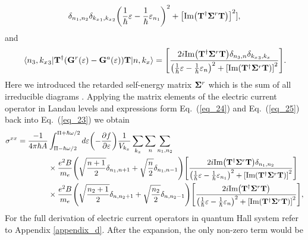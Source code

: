 \begin{widetext}
\begin{equation}
{  \delta_{n_1,n_2}\delta_{{k_x}_1,{k_x}_2}}
  {
  \qty(
  \frac{1}{\hbar}\varepsilon -
  \frac{1}{\hbar}\varepsilon_{n_1}
  )^2
  + \qty[\text{Im}\qty(\vb{T}^{\dagger} \vb{\Sigma}^r \vb{T})]^2
  }],
\end{equation}
and
\begin{equation} \label{eq_25}
  \mel{{n_3,{k_x}_3}}{
  \vb{T}^{\dagger}
  \qty(
  \vb{G}^{r} (\varepsilon) - \vb{G}^{a} (\varepsilon)
  )\vb{T}}
  {n,{k_x}} =
  \qty[
  \frac{2i \text{Im}\qty(\vb{T}^{\dagger} \vb{\Sigma}^r \vb{T})
  \delta_{n_3,n}\delta_{{k_x}_3,{k_x}}}
  {
  \qty(
  \frac{1}{\hbar}\varepsilon -
  \frac{1}{\hbar}\varepsilon_{n}
  )^2
  + \qty[\text{Im}\qty(\vb{T}^{\dagger} \vb{\Sigma}^r \vb{T})]^2
  }].
\end{equation}
Here we introduced the retarded self-energy matrix $\vb{\Sigma}^r$ which is the sum of all irreducible diagrams \cite{wackerl20,wackerlthesis20}. Applying the matrix elements of the electric current operator in Landau levels and
expressions form Eq.~(\ref{eq_24}) and Eq.~(\ref{eq_25}) back into Eq.~(\ref{eq_23}) we obtain
\begin{equation} \label{eq_26}
  \begin{aligned}
    {\sigma}^{xx}  =
    \frac{-1}{4\pi\hbar A} &
    \int_{\Pi-\hbar\omega/2}^{\Pi+ \hbar\omega/2} d\varepsilon
    \qty(
    -\frac{\partial f}{\partial \varepsilon})
    \frac{1}{V_{k_x}} \sum_{k_x} \sum_{n}
    \sum_{n_1,n_2}
    \\
    & \times
    \frac{e^2B}{{m_e}}
    \qty(\sqrt{\frac{n+1}{2}} \delta_{n_1,n+1} + \sqrt{\frac{n}{2}}
    \delta_{n_1,n-1})
    \qty[
    \frac{2i \text{Im}\qty(\vb{T}^{\dagger} \vb{\Sigma}^r \vb{T})
    \delta_{n_1,n_2}}
    {
    \qty(
    \frac{1}{\hbar}\varepsilon -
    \frac{1}{\hbar}\varepsilon_{n_1}
    )^2
    + \qty[\text{Im}\qty(\vb{T}^{\dagger} \vb{\Sigma}^r \vb{T})]^2
    }] \\
    & \times
    \frac{e^2B}{{m_e}}
    \qty(\sqrt{\frac{n_2+1}{2}} \delta_{n,n_2+1} + \sqrt{\frac{n_2}{2}}
    \delta_{n,n_2-1})
    \qty[
    \frac{2i \text{Im}\qty(\vb{T}^{\dagger} \vb{\Sigma}^r \vb{T})
    }
    {
    \qty(
    \frac{1}{\hbar}\varepsilon -
    \frac{1}{\hbar}\varepsilon_{n}
    )^2
    + \qty[\text{Im}\qty(\vb{T}^{\dagger} \vb{\Sigma}^r \vb{T})]^2
    }],
  \end{aligned}
\end{equation}
For the full derivation of electric current operators in quantum Hall system refer to Appendix \ref{appendix_d}.
After the expansion, the only non-zero term would be
\begin{equation} \label{eq_27}

\end{equation}
\end{widetext}
